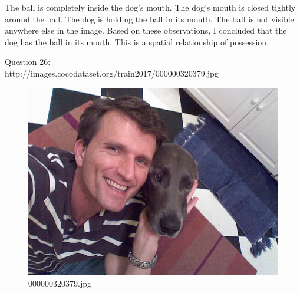 \begin{enumerate}
        The ball is completely inside the dog's mouth.
        The dog's mouth is closed tightly around the ball.
        The dog is holding the ball in its mouth.
        The ball is not visible anywhere else in the image.
        Based on these observations, I concluded that the dog has the ball in its mouth. This is a spatial relationship of possession.
    \end{enumerate}
    Question 26:\\http://images.cocodataset.org/train2017/000000320379.jpg
    \begin{figure}[h]
        \centering
        \includegraphics[width=0.8\linewidth]{../image set/easy/000000320379.jpg}
        \caption{000000320379.jpg}
    \end{figure}

